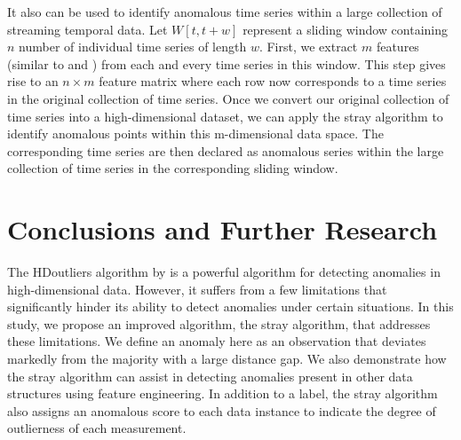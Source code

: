 \documentclass[11pt,a4paper,]{article}
\theoremstyle{definition}
\theoremstyle{definition}
\theoremstyle{definition}
\theoremstyle{remark}
\begin{document}
It also can be used to identify anomalous time series within a large collection of streaming temporal data. Let \(W[t, t+w]\) represent a sliding window containing \(n\) number of individual time series of length \(w\). First, we extract \(m\) features (similar to \textcite{hyndman2015large} and \textcite{talagala2019feature}) from each and every time series in this window. This step gives rise to an \(n\times m\) feature matrix where each row now corresponds to a time series in the original collection of time series. Once we convert our original collection of time series into a high-dimensional dataset, we can apply the stray algorithm to identify anomalous points within this m-dimensional data space. The corresponding time series are then declared as anomalous series within the large collection of time series in the corresponding sliding window.

\hypertarget{conclusions-and-further-research}{%
\section{Conclusions and Further Research}\label{conclusions-and-further-research}}

\label{sec:conclusions}

The HDoutliers algorithm by \textcite{wilkinson2017visualizing} is a powerful algorithm for detecting anomalies in high-dimensional data. However, it suffers from a few limitations that significantly hinder its ability to detect anomalies under certain situations. In this study, we propose an improved algorithm, the stray algorithm, that addresses these limitations. We define an anomaly here as an observation that deviates markedly from the majority with a large distance gap. We also demonstrate how the stray algorithm can assist in detecting anomalies present in other data structures using feature engineering. In addition to a label, the stray algorithm also assigns an anomalous score to each data instance to indicate the degree of outlierness of each measurement.
\end{document}
